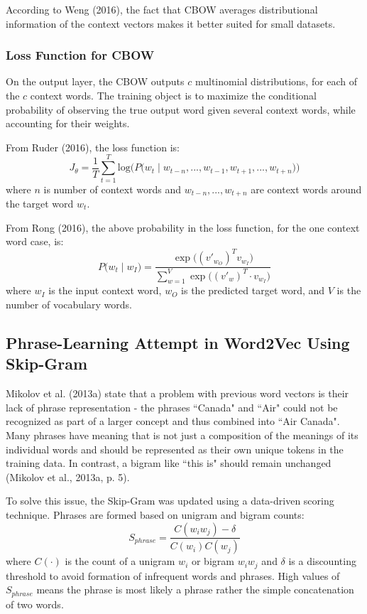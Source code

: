 According to Weng (2016), the fact that CBOW averages distributional information of the context vectors makes it better suited for small datasets. 

\subsubsection{Loss Function for CBOW}

On the output layer, the CBOW outputs $c$ multinomial distributions, for each of the $c$ context words. The training object is to maximize the conditional probability of observing the true output word given several context words, while accounting for their weights. 

From Ruder (2016), the loss function is: 
$$
J_\theta = \frac{1}{T} \sum_{t=1}^T \text{log} \Big( P \Big( w_t \; | \; w_{t-n}, ..., w_{t-1}, w_{t+1}, ..., w_{t+n} \Big) \Big)
$$
where $n$ is number of context words and $w_{t-n}, ..., w_{t+n}$ are context words around the target word $w_t$. 

From Rong (2016), the above probability in the loss function, for the one context word case, is:
$$
P \Big( w_t \; | \; w_I \Big) = \frac {\exp{ \Big( (v'_{w_O})^T  v_{w_I} \Big) }} {\sum_{w=1}^V \exp{ \Big( (v'_w)^T \cdot v_{w_I} \Big) }}
$$
where $w_I$ is the input context word, $w_O$ is the predicted target word, and $V$ is the number of vocabulary words. 


\subsection{Phrase-Learning Attempt in Word2Vec Using Skip-Gram}

Mikolov et al. (2013a) state that a problem with previous word vectors is their lack of phrase representation - the phrases ``Canada" and ``Air" could not be recognized as part of a larger concept and thus combined into ``Air Canada". Many phrases have meaning that is not just a composition of the meanings of its individual words and should be represented as their own unique tokens in the training data. In contrast, a bigram like ``this is" should remain unchanged (Mikolov et al., 2013a, p. 5). 

To solve this issue, the Skip-Gram was updated using a data-driven scoring technique. Phrases are formed based on unigram and bigram counts: 
$$
S_{phrase} = \frac{C(w_i w_j) - \delta} {C(w_i)C(w_j)}
$$
where $C(\cdot)$ is the count of a unigram $w_i$ or bigram $w_i w_j$ and $\delta$ is a discounting threshold to avoid formation of infrequent words and phrases. High values of $S_{phrase}$ means the phrase is most likely a phrase rather the simple concatenation of two words. 

